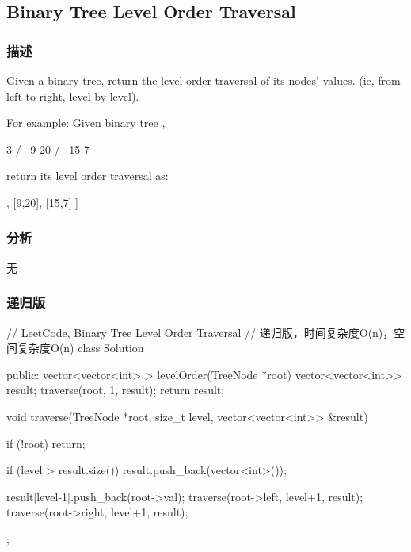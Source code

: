\subsection{Binary Tree Level Order Traversal}
\label{sec:binary-tree-tevel-order-traversal}


\subsubsection{描述}
Given a binary tree, return the level order traversal of its nodes' values. (ie, from left to right, level by level).

For example:
Given binary tree ,
\begin{Code}
    3
   / \
  9  20
    /  \
   15   7
\end{Code}
return its level order traversal as:
\begin{Code}
[
  [3],
  [9,20],
  [15,7]
]
\end{Code}


\subsubsection{分析}
无


\subsubsection{递归版}
\begin{Code}
// LeetCode, Binary Tree Level Order Traversal
// 递归版，时间复杂度O(n)，空间复杂度O(n)
class Solution {
public:
    vector<vector<int> > levelOrder(TreeNode *root) {
        vector<vector<int>> result;
        traverse(root, 1, result);
        return result;
    }

    void traverse(TreeNode *root, size_t level, vector<vector<int>> &result) {
        if (!root) return;

        if (level > result.size())
            result.push_back(vector<int>());

        result[level-1].push_back(root->val);
        traverse(root->left, level+1, result);
        traverse(root->right, level+1, result);
    }
};
\end{Code}


